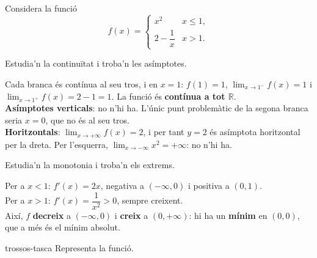 Considera la funció
\[
f(x)=\begin{cases}
  x^2 & \si{x\le 1},\\[4pt]
  2-\dfrac{1}{x} & \si{x>1}.
\end{cases}
\]

\begin{apartats}

Estudia'n la continuïtat i troba'n les asímptotes.

\begin{solucio}
Cada branca és contínua al seu tros, i en $x=1$: $f(1)=1$, $\lim_{x\to1^-}f(x)=1$ i
$\lim_{x\to1^+}f(x)=2-1=1$. La funció és \textbf{contínua a tot $\mathbb{R}$}.\\
\textbf{Asímptotes verticals}: no n'hi ha. L'únic punt problemàtic de la segona branca seria
$x=0$, que no és al seu tros.\\
\textbf{Horitzontals}: $\lim_{x\to+\infty}f(x)=2$, i per tant $y=2$ és asímptota horitzontal
per la dreta. Per l'esquerra, $\lim_{x\to-\infty}x^2=+\infty$: no n'hi ha.
\end{solucio}

\begin{nomesllarg}
Estudia'n la monotonia i troba'n els extrems.

\begin{solucio}
Per a $x<1$: $f'(x)=2x$, negativa a $(-\infty,0)$ i positiva a $(0,1)$.\\
Per a $x>1$: $f'(x)=\dfrac{1}{x^2}>0$, sempre creixent.\\
Així, $f$ \textbf{decreix} a $(-\infty,0)$ i \textbf{creix} a $(0,+\infty)$: hi ha un
\textbf{mínim} en $(0,0)$, que a més és el mínim absolut.
\end{solucio}
\end{nomesllarg}

\begin{tria}{trossos-tasca}
Representa la funció.


\end{tria}
\end{apartats}
